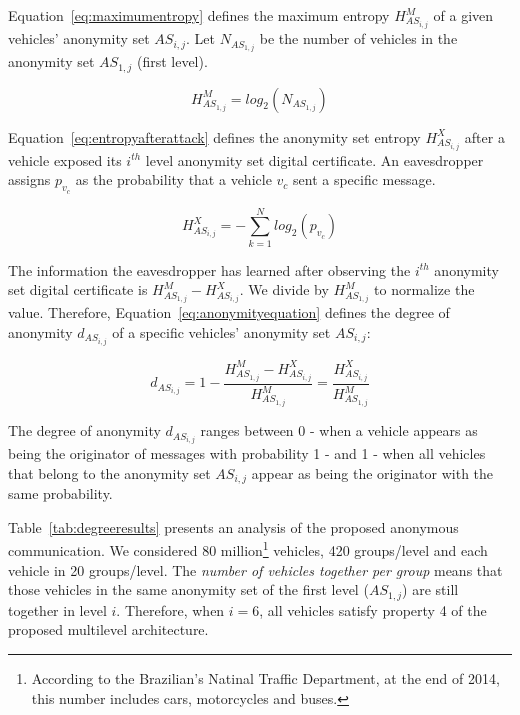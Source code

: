 \documentclass[preprint,12pt]{elsarticle}
\begin{document}
Equation~\ref{eq:maximumentropy} defines the maximum entropy $H^{M}_{AS_{i,j}}$ of a given vehicles' anonymity set $AS_{i,j}$. Let $N_{AS_{1,j}}$ be the number of vehicles in the anonymity set $AS_{1,j}$ (first level).

\begin{equation}
\label{eq:maximumentropy}
H^{M}_{AS_{1,j}} = log_{2}(N_{AS_{1,j}})
\end{equation}

Equation~\ref{eq:entropyafterattack} defines the anonymity set entropy $H^{X}_{AS_{i,j}}$ after a vehicle exposed its $i^{th}$ level anonymity set digital certificate. An eavesdropper assigns $p_{v_c}$ as the probability that a vehicle $v_{c}$ sent a specific message.

\begin{equation}
\label{eq:entropyafterattack}
H^{X}_{AS_{i,j}} = - \sum_{k=1}^{N} log_{2} (p_{v_c})
\end{equation}

The information the eavesdropper has learned after observing the $i^{th}$ anonymity set digital certificate is $H^{M}_{AS_{1,j}}  - H^{X}_{AS_{i,j}}$. We divide by $H^{M}_{AS_{1,j}}$ to normalize the value. Therefore, Equation~\ref{eq:anonymityequation} defines the degree of anonymity $d_{AS_{i, j}}$ of a specific vehicles' anonymity set $AS_{i,j}$:

\begin{equation}
\label{eq:anonymityequation}
d_{AS_{i, j}} = 1 - \frac{H^{M}_{AS_{1,j}} - H^{X}_{AS_{i,j}}}{H^{M}_{AS_{1,j}}} = \frac{H^{X}_{AS_{i,j}}}{H^{M}_{AS_{1,j}}}
\end{equation}

The degree of anonymity $d_{AS_{i, j}}$ ranges between 0 - when a vehicle appears as being the originator of messages with probability 1 - and 1 - when all vehicles that belong to the anonymity set $AS_{i, j}$ appear as being the originator with the same probability.

Table~\ref{tab:degreeresults} presents an analysis of the proposed anonymous communication. We considered 80 million\footnote{According to the Brazilian's Natinal Traffic Department, at the end of 2014, this number includes cars, motorcycles and buses.} vehicles, 420 groups/level and each vehicle in 20 groups/level. The \textit{number of vehicles together per group} means that those vehicles in the same anonymity set of the first level ($AS_{1, j}$) are still together in level $i$. Therefore, when $i = 6$, all vehicles satisfy property 4 of the proposed multilevel architecture.
\end{document}
